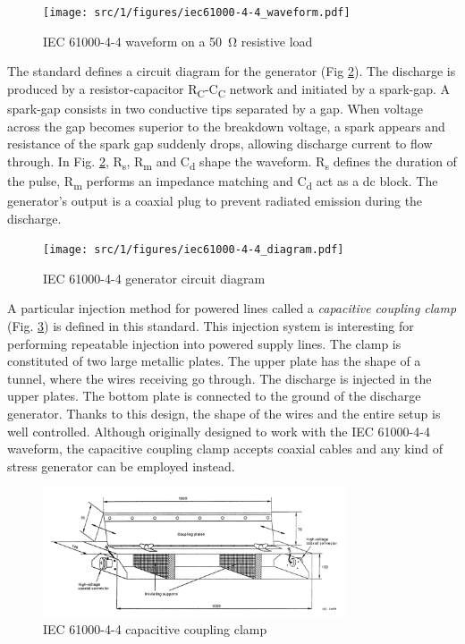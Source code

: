 \begin{figure}[!h]
  \centering
  \texttt{[image: src/1/figures/iec61000-4-4\_waveform.pdf]}
  \caption{IEC 61000-4-4 waveform on a \SI{50}{\ohm} resistive load}
  \label{fig:iec_4_4_pulse}
\end{figure}

The standard defines a circuit diagram for the generator (Fig \ref{fig:iec_4_4_generator}).
The discharge is produced by a resistor-capacitor R\textsubscript{C}-C\textsubscript{C} network and initiated by a spark-gap.
A spark-gap consists in two conductive tips separated by a gap.
When voltage across the gap becomes superior to the breakdown voltage, a spark appears and resistance of the spark gap suddenly drops, allowing discharge current to flow through.
In Fig. \ref{fig:iec_4_4_generator}, R\textsubscript{s}, R\textsubscript{m} and C\textsubscript{d} shape the waveform.
R\textsubscript{s} defines the duration of the pulse, R\textsubscript{m} performs an impedance matching and C\textsubscript{d} act as a \gls{dc} block.
The generator's output is a coaxial plug to prevent radiated emission during the discharge.

\begin{figure}[!h]
  \centering
  \texttt{[image: src/1/figures/iec61000-4-4\_diagram.pdf]}
  \caption{IEC 61000-4-4 generator circuit diagram}
  \label{fig:iec_4_4_generator}
\end{figure}

A particular injection method for powered lines called a \textit{capacitive coupling clamp} (Fig. \ref{fig:iec_4_4_clamp}) is defined in this standard.
This injection system is interesting for performing repeatable injection into powered supply lines.
The clamp is constituted of two large metallic plates.
The upper plate has the shape of a tunnel, where the wires receiving go through.
The discharge is injected in the upper plates.
The bottom plate is connected to the ground of the discharge generator.
Thanks to this design, the shape of the wires and the entire setup is well controlled.
Although originally designed to work with the IEC 61000-4-4 waveform, the capacitive coupling clamp accepts coaxial cables and any kind of stress generator can be employed instead.

\begin{figure}[!h]
  \centering
  \includegraphics[width=0.8\textwidth]{src/1/figures/iec61000-4-4_clamp.png}
  \caption{IEC 61000-4-4 capacitive coupling clamp}
  \label{fig:iec_4_4_clamp}
\end{figure}

